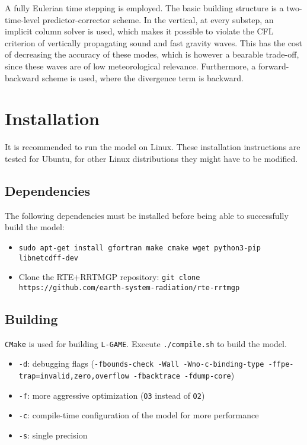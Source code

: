 \documentclass[10pt]{report}
\begin{document}
A fully Eulerian time stepping is employed. The basic building structure is a two-time-level predictor-corrector scheme. In the vertical, at every substep, an implicit column solver is used, which makes it possible to violate the CFL criterion of vertically propagating sound and fast gravity waves. This has the cost of decreasing the accuracy of these modes, which is however a bearable trade-off, since these waves are of low meteorological relevance. Furthermore, a forward-backward scheme is used, where the divergence term is backward.

\chapter{Installation}
\label{chap:installation}

It is recommended to run the model on Linux. These installation instructions are tested for Ubuntu, for other Linux distributions they might have to be modified.

\section{Dependencies}
\label{sec:dependencies}

The following dependencies must be installed before being able to successfully build the model:

\begin{itemize}
\item \texttt{sudo apt-get install gfortran make cmake wget python3-pip libnetcdff-dev}
\item Clone the RTE+RRTMGP repository: \texttt{git clone https://github.com/earth-system-radiation/rte-rrtmgp}
\end{itemize}

\section{Building}
\label{sec:building}

\texttt{CMake} is used for building \texttt{L-GAME}. Execute \texttt{./compile.sh} to build the model.
%
\begin{itemize}
\item \texttt{-d}: debugging flags (\texttt{-fbounds-check -Wall -Wno-c-binding-type -ffpe-trap=invalid,zero,overflow -fbacktrace -fdump-core})
\item \texttt{-f}: more aggressive optimization (\texttt{O3} instead of \texttt{O2})
\item \texttt{-c}: compile-time configuration of the model for more performance
\item \texttt{-s}: single precision
\end{itemize}
\end{document}
